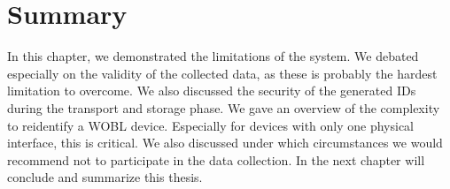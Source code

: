     
    

\section{Summary}
In this chapter, we demonstrated the limitations of the system. We debated especially on the validity of the collected data, as these is probably the hardest limitation to overcome.
We also discussed the security of the generated IDs during the transport and storage phase. We gave an overview of the complexity to reidentify a WOBL device. Especially for devices with only one physical interface, this is critical. We also discussed under which circumstances we would recommend not to participate in the data collection.
In the next chapter will conclude and summarize this thesis.

